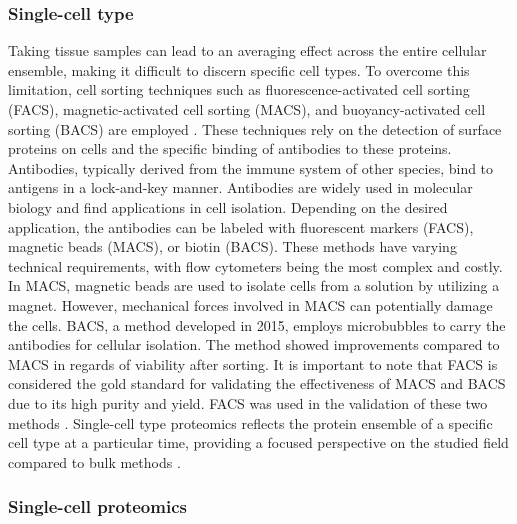 \documentclass[
]{article}
\begin{document}
\hypertarget{single-cell-type}{%
\subsubsection{Single-cell type}\label{single-cell-type}}

Taking tissue samples can lead to an averaging effect across the entire
cellular ensemble, making it difficult to discern specific cell types.
To overcome this limitation, cell sorting techniques such as
fluorescence-activated cell sorting (FACS), magnetic-activated cell
sorting (MACS), and buoyancy-activated cell sorting (BACS) are employed
\citep{Liou2015}. These techniques rely on the detection of surface
proteins on cells and the specific binding of antibodies to these
proteins. Antibodies, typically derived from the immune system of other
species, bind to antigens in a lock-and-key manner. Antibodies are
widely used in molecular biology and find applications in cell
isolation. Depending on the desired application, the antibodies can be
labeled with fluorescent markers (FACS), magnetic beads (MACS), or
biotin (BACS). These methods have varying technical requirements, with
flow cytometers being the most complex and costly. In MACS, magnetic
beads are used to isolate cells from a solution by utilizing a magnet.
However, mechanical forces involved in MACS can potentially damage the
cells. BACS, a method developed in 2015, employs microbubbles to carry
the antibodies for cellular isolation. The method showed improvements
compared to MACS in regards of viability after sorting. It is important
to note that FACS is considered the gold standard for validating the
effectiveness of MACS and BACS due to its high purity and yield. FACS
was used in the validation of these two methods
\citep{Liou2015, Sutermaster2019}. Single-cell type proteomics reflects
the protein ensemble of a specific cell type at a particular time,
providing a focused perspective on the studied field compared to bulk
methods \citep{Maes2020}.

\hypertarget{single-cell-proteomics}{%
\subsubsection{Single-cell proteomics}\label{single-cell-proteomics}}
\end{document}
